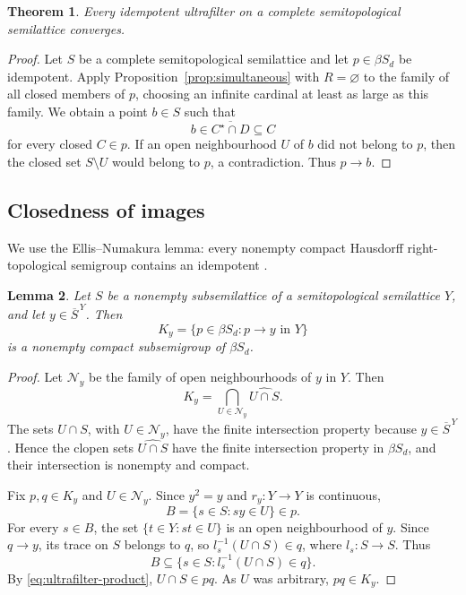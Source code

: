 \documentclass[11pt,a4paper]{article}
\newtheorem{theorem}{Theorem}[section]
\newtheorem{lemma}[theorem]{Lemma}
\theoremstyle{definition}
\theoremstyle{remark}
\numberwithin{equation}{section}
\newcommand{\cl}[1]{\overline{#1}}
\begin{document}
\begin{theorem}\label{thm:idempotent}
Every idempotent ultrafilter on a complete semitopological semilattice
converges.
\end{theorem}

\begin{proof}
Let \(S\) be a complete semitopological semilattice and let
\(p\in\beta S_d\) be idempotent. Apply
Proposition~\ref{prop:simultaneous} with \(R=\varnothing\) to the
family of all closed members of \(p\), choosing an infinite cardinal
at least as large as this family. We obtain a point \(b\in S\) such that
\[
b\in\cl{C^\star\cap D}\subseteq C
\]
for every closed \(C\in p\). If an open neighbourhood \(U\) of
\(b\) did not belong to \(p\), then the closed set \(S\setminus U\)
would belong to \(p\), a contradiction. Thus \(p\to b\).
\end{proof}

\subsection{Closedness of images}\label{sec:images}
We use the Ellis--Numakura lemma: every nonempty compact Hausdorff
right-topological semigroup contains an idempotent
\cite[Theorem~2.5]{HS}.

\begin{lemma}\label{lem:boundary}
Let \(S\) be a nonempty subsemilattice of a semitopological semilattice
\(Y\), and let \(y\in\cl S^{\,Y}\). Then
\[
K_y=\{p\in\beta S_d:p\to y\text{ in }Y\}
\]
is a nonempty compact subsemigroup of \(\beta S_d\).
\end{lemma}

\begin{proof}
Let \(\mathcal N_y\) be the family of open neighbourhoods of \(y\) in \(Y\).
Then
\[
K_y=\bigcap_{U\in\mathcal N_y}\widehat{U\cap S}.
\]
The sets \(U\cap S\), with \(U\in\mathcal N_y\), have the finite
intersection property because \(y\in\cl S^{\,Y}\). Hence the clopen
sets \(\widehat{U\cap S}\) have the finite intersection property in
\(\beta S_d\), and their intersection is nonempty and compact.

Fix \(p,q\in K_y\) and \(U\in\mathcal N_y\).
Since \(y^2=y\) and \(r_y:Y\to Y\) is continuous,
\[
B=\{s\in S:sy\in U\}\in p.
\]
For every \(s\in B\), the set \(\{t\in Y:st\in U\}\) is an open
neighbourhood of \(y\). Since \(q\to y\), its trace on \(S\) belongs
to \(q\), so \(l_s^{-1}(U\cap S)\in q\), where \(l_s:S\to S\).
Thus
\[
B\subseteq\{s\in S:l_s^{-1}(U\cap S)\in q\}.
\]
By \eqref{eq:ultrafilter-product}, \(U\cap S\in pq\).
As \(U\) was arbitrary, \(pq\in K_y\).
\end{proof}
\end{document}
